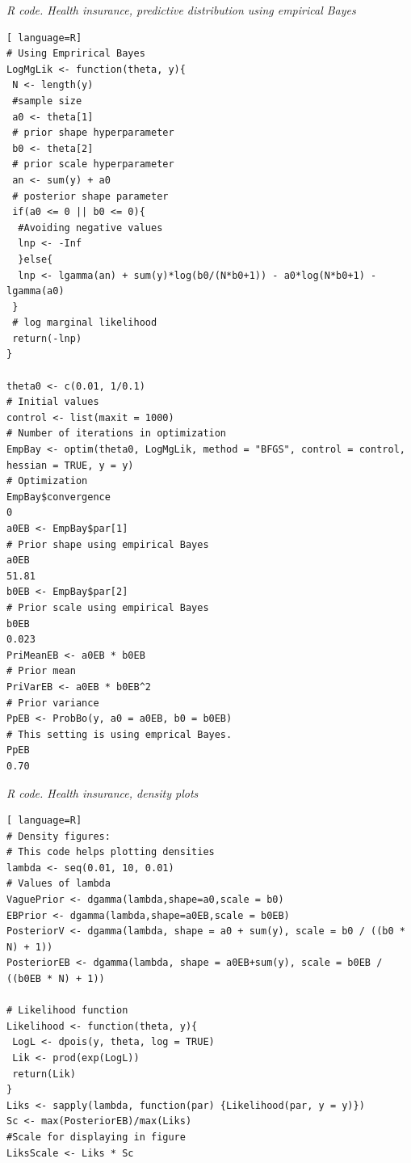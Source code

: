 \begin{tcolorbox}[enhanced,width=4.67in,center upper,
	fontupper=\large\bfseries,drop shadow southwest,sharp corners]
\textit{R code. Health insurance, predictive distribution using empirical Bayes}
\begin{VF}
\begin{lstlisting}[ language=R]
# Using Emprirical Bayes
LogMgLik <- function(theta, y){
 N <- length(y) 
 #sample size
 a0 <- theta[1] 
 # prior shape hyperparameter
 b0 <- theta[2] 
 # prior scale hyperparameter
 an <- sum(y) + a0 
 # posterior shape parameter
 if(a0 <= 0 || b0 <= 0){ 
  #Avoiding negative values
  lnp <- -Inf
  }else{
  lnp <- lgamma(an) + sum(y)*log(b0/(N*b0+1)) - a0*log(N*b0+1) - lgamma(a0)
 } 
 # log marginal likelihood
 return(-lnp)
}
			
theta0 <- c(0.01, 1/0.1) 
# Initial values
control <- list(maxit = 1000) 
# Number of iterations in optimization
EmpBay <- optim(theta0, LogMgLik, method = "BFGS", control = control, hessian = TRUE, y = y) 
# Optimization
EmpBay$convergence
0
a0EB <- EmpBay$par[1] 
# Prior shape using empirical Bayes
a0EB
51.81
b0EB <- EmpBay$par[2] 
# Prior scale using empirical Bayes
b0EB
0.023
PriMeanEB <- a0EB * b0EB 
# Prior mean
PriVarEB <- a0EB * b0EB^2 
# Prior variance
PpEB <- ProbBo(y, a0 = a0EB, b0 = b0EB) 
# This setting is using emprical Bayes.
PpEB
0.70 
\end{lstlisting}
\end{VF}
\end{tcolorbox} 

\begin{tcolorbox}[enhanced,width=4.67in,center upper,
	fontupper=\large\bfseries,drop shadow southwest,sharp corners]
	\textit{R code. Health insurance, density plots}
\begin{VF}
\begin{lstlisting}[ language=R]		
# Density figures: 
# This code helps plotting densities
lambda <- seq(0.01, 10, 0.01) 
# Values of lambda
VaguePrior <- dgamma(lambda,shape=a0,scale = b0)
EBPrior <- dgamma(lambda,shape=a0EB,scale = b0EB)
PosteriorV <- dgamma(lambda, shape = a0 + sum(y), scale = b0 / ((b0 * N) + 1)) 
PosteriorEB <- dgamma(lambda, shape = a0EB+sum(y), scale = b0EB / ((b0EB * N) + 1))
			
# Likelihood function
Likelihood <- function(theta, y){
 LogL <- dpois(y, theta, log = TRUE)
 Lik <- prod(exp(LogL))
 return(Lik)
}
Liks <- sapply(lambda, function(par) {Likelihood(par, y = y)})
Sc <- max(PosteriorEB)/max(Liks) 
#Scale for displaying in figure
LiksScale <- Liks * Sc
\end{lstlisting}
\end{VF}
\end{tcolorbox} 

